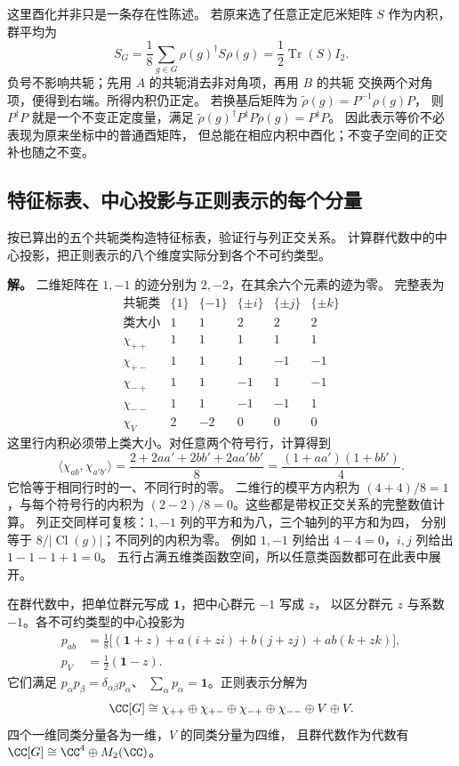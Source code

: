 这里酉化并非只是一条存在性陈述。
若原来选了任意正定厄米矩阵 $S$ 作为内积，群平均为
\[
S_G=\frac18\sum_{g\in G}\rho(g)^\dagger S\rho(g)
=\frac12\operatorname{Tr}(S)I_2.
\]
负号不影响共轭；先用 $A$ 的共轭消去非对角项，再用 $B$ 的共轭
交换两个对角项，便得到右端。所得内积仍正定。
若换基后矩阵为 $\widetilde\rho(g)=P^{-1}\rho(g)P$，
则 $P^\dagger P$ 就是一个不变正定度量，满足
$\widetilde\rho(g)^\dagger P^\dagger P\widetilde\rho(g)=P^\dagger P$。
因此表示等价不必表现为原来坐标中的普通酉矩阵，
但总能在相应内积中酉化；不变子空间的正交补也随之不变。

\subsection{特征标表、中心投影与正则表示的每个分量}

\begin{exbox}[不用猜测完成分解]
按已算出的五个共轭类构造特征标表，验证行与列正交关系。
计算群代数中的中心投影，把正则表示的八个维度实际分到各个不可约类型。
\end{exbox}

\textbf{解。} 二维矩阵在 $1,-1$ 的迹分别为 $2,-2$，在其余六个元素的迹为零。
完整表为
\[
\begin{array}{c|rrrrr}
\text{共轭类}&\{1\}&\{-1\}&\{\pm i\}&\{\pm j\}&\{\pm k\}\\
\text{类大小}&1&1&2&2&2\\\hline
\chi_{++}&1&1&1&1&1\\
\chi_{+-}&1&1&1&-1&-1\\
\chi_{-+}&1&1&-1&1&-1\\
\chi_{--}&1&1&-1&-1&1\\
\chi_V&2&-2&0&0&0
\end{array}
\]
这里行内积必须带上类大小。对任意两个符号行，计算得到
\[
\langle\chi_{ab},\chi_{a'b'}\rangle
=\frac{2+2aa'+2bb'+2aa'bb'}8
=\frac{(1+aa')(1+bb')}4.
\]
它恰等于相同行时的一、不同行时的零。
二维行的模平方内积为 $(4+4)/8=1$，与每个符号行的内积为
$(2-2)/8=0$。这些都是带权正交关系的完整数值计算。
列正交同样可复核：$1,-1$ 列的平方和为八，三个轴列的平方和为四，
分别等于 $8/|\operatorname{Cl}(g)|$；不同列的内积为零。
例如 $1,-1$ 列给出 $4-4=0$，$i,j$ 列给出 $1-1-1+1=0$。
五行占满五维类函数空间，所以任意类函数都可在此表中展开。

\begin{proposition}[中心幂等元与正则表示]
\label{prop:q8-central-projectors}
在群代数中，把单位群元写成 $\mathbf1$，把中心群元 $-1$ 写成 $z$，
以区分群元 $z$ 与系数 $-1$。各不可约类型的中心投影为
\[
\begin{aligned}
p_{ab}&=\frac18\bigl[(\mathbf1+z)+a(i+zi)
 +b(j+zj)+ab(k+zk)\bigr],\\
p_V&=\frac12(\mathbf1-z).
\end{aligned}
\]
它们满足 $p_\alpha p_\beta=\delta_{\alpha\beta}p_\alpha$、
$\sum_\alpha p_\alpha=\mathbf1$。正则表示分解为
\[
\CC[G]\cong\chi_{++}\oplus\chi_{+-}\oplus\chi_{-+}\oplus\chi_{--}
\oplus V\oplus V.
\]
四个一维同类分量各为一维，$V$ 的同类分量为四维，
且群代数作为代数有
$\CC[G]\cong\CC^4\oplus M_2(\CC)$。
\end{proposition}

